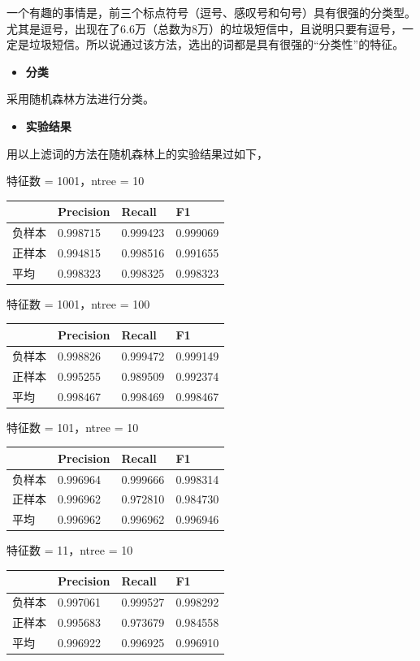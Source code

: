 一个有趣的事情是，前三个标点符号（逗号、感叹号和句号）具有很强的分类型。尤其是逗号，出现在了6.6万（总数为8万）的垃圾短信中，且说明只要有逗号，一定是垃圾短信。所以说通过该方法，选出的词都是具有很强的``分类性''的特征。

\begin{itemize}
\tightlist
\item
  \textbf{分类}
\end{itemize}

采用随机森林方法进行分类。

\begin{itemize}
\tightlist
\item
  \textbf{实验结果}
\end{itemize}

用以上滤词的方法在随机森林上的实验结果过如下，

特征数 = 1001，ntree = 10

\begin{longtable}[]{@{}llll@{}}
\toprule
& Precision & Recall & F1\tabularnewline
\midrule
\endhead
负样本 & 0.998715 & 0.999423 & 0.999069\tabularnewline
正样本 & 0.994815 & 0.998516 & 0.991655\tabularnewline
平均 & 0.998323 & 0.998325 & 0.998323\tabularnewline
\bottomrule
\end{longtable}

特征数 = 1001，ntree = 100

\begin{longtable}[]{@{}llll@{}}
\toprule
& Precision & Recall & F1\tabularnewline
\midrule
\endhead
负样本 & 0.998826 & 0.999472 & 0.999149\tabularnewline
正样本 & 0.995255 & 0.989509 & 0.992374\tabularnewline
平均 & 0.998467 & 0.998469 & 0.998467\tabularnewline
\bottomrule
\end{longtable}

特征数 = 101，ntree = 10

\begin{longtable}[]{@{}llll@{}}
\toprule
& Precision & Recall & F1\tabularnewline
\midrule
\endhead
负样本 & 0.996964 & 0.999666 & 0.998314\tabularnewline
正样本 & 0.996962 & 0.972810 & 0.984730\tabularnewline
平均 & 0.996962 & 0.996962 & 0.996946\tabularnewline
\bottomrule
\end{longtable}

特征数 = 11，ntree = 10

\begin{longtable}[]{@{}llll@{}}
\toprule
& Precision & Recall & F1\tabularnewline
\midrule
\endhead
负样本 & 0.997061 & 0.999527 & 0.998292\tabularnewline
正样本 & 0.995683 & 0.973679 & 0.984558\tabularnewline
平均 & 0.996922 & 0.996925 & 0.996910\tabularnewline
\bottomrule
\end{longtable}

